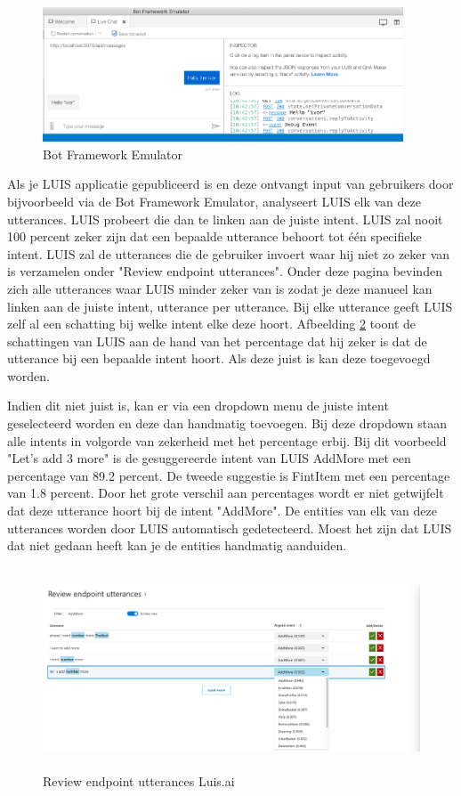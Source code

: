 \begin{figure}[h!]
	\centering
	\includegraphics[height=4cm]{img/emulator.png}
	\caption{Bot Framework Emulator}
	\label{fig:emulator}
\end{figure}

Als je LUIS applicatie gepubliceerd is en deze ontvangt input van gebruikers door bijvoorbeeld via de Bot Framework Emulator, analyseert LUIS elk van deze utterances. LUIS probeert die dan te linken aan de juiste intent. LUIS zal nooit 100 percent zeker zijn dat een bepaalde utterance behoort tot één specifieke intent. LUIS zal de utterances die de gebruiker invoert waar hij niet zo zeker van is verzamelen onder "Review endpoint utterances". Onder deze pagina bevinden zich alle utterances waar LUIS minder zeker van is zodat je deze manueel kan linken aan de juiste intent, utterance per utterance. Bij elke utterance geeft LUIS zelf al een schatting bij welke intent elke deze hoort. Afbeelding \ref{fig:review} toont de schattingen van LUIS aan de hand van het percentage dat hij zeker is dat de utterance bij een bepaalde intent hoort. Als deze juist is kan deze toegevoegd worden. 

Indien dit niet juist is, kan er via een dropdown menu de juiste intent geselecteerd worden en deze dan handmatig toevoegen. Bij deze dropdown staan alle intents in volgorde van zekerheid met het percentage erbij. Bij dit voorbeeld "Let's add 3 more" is de gesuggereerde intent van LUIS AddMore met een percentage van 89.2 percent. De tweede suggestie is FintItem met een percentage van 1.8 percent. Door het grote verschil aan percentages wordt er niet getwijfelt dat deze utterance hoort bij de intent "AddMore". De entities van elk van deze utterances worden door LUIS automatisch gedetecteerd. Moest het zijn dat LUIS dat niet gedaan heeft kan je de entities handmatig aanduiden.

\begin{figure}[h!]
	\centering
	\includegraphics[height=6cm]{img/review.png}
	\caption{Review endpoint utterances Luis.ai}
	\label{fig:review}
\end{figure}

